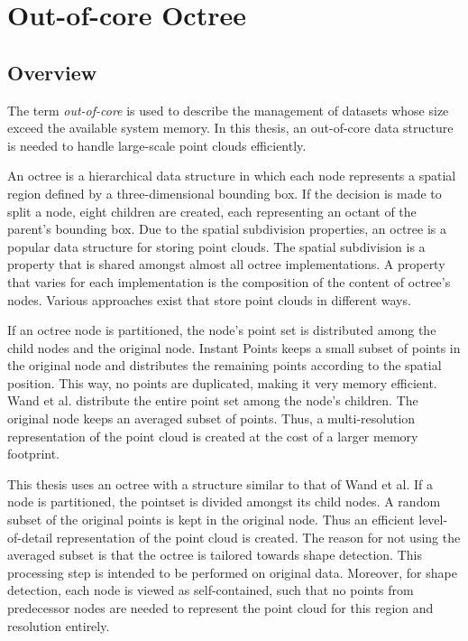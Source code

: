 \chapter{Out-of-core Octree}
\label{chap:octree}


\section{Overview}

The term \textit{out-of-core} is used to describe the management of datasets whose size exceed the available system memory. In this thesis, an out-of-core data structure is needed to handle large-scale point clouds efficiently. 

An octree is a hierarchical data structure in which each node represents a spatial region defined by a three-dimensional bounding box. If the decision is made to split a node, eight children are created, each representing an octant of the parent's bounding box. Due to the spatial subdivision properties, an octree is a popular data structure for storing point clouds. The spatial subdivision is a property that is shared amongst almost all octree implementations. A property that varies for each implementation is the composition of the content of octree's nodes. Various approaches exist that store point clouds in different ways. 

If an octree node is partitioned, the node's point set is distributed among the child nodes and the original node. 
Instant Points \cite{wimmer2006instant} keeps a small subset of points in the original node and distributes the remaining points according to the spatial position. This way, no points are duplicated, making it very memory efficient. 
Wand et al. \cite{wand2007interactive} distribute the entire point set among the node's children. The original node keeps an averaged subset of points. Thus, a multi-resolution representation of the point cloud is created at the cost of a larger memory footprint. 

This thesis uses an octree with a structure similar to that of Wand et al. If a node is partitioned, the pointset is divided amongst its child nodes. A random subset of the original points is kept in the original node. Thus an efficient level-of-detail representation of the point cloud is created. 
The reason for not using the averaged subset is that the octree is tailored towards shape detection. This processing step is intended to be performed on original data. Moreover, for shape detection, each node is viewed as self-contained, such that no points from predecessor nodes are needed to represent the point cloud for this region and resolution entirely. 

